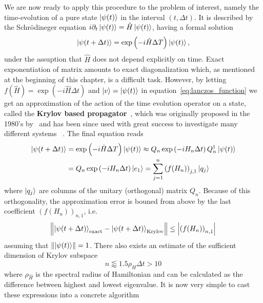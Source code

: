 We are now ready to apply this procedure to the problem of interest, namely the time-evolution of a pure
state \(\ket{\psi(t)}\) in the interval \(\left(t, \Delta t\right)\). It is described by the Schr{\"o}dineger equation
\(i\partial_t \ket{\psi(t)} = \hat{H} \ket{\psi(t)}\), having a formal solution
\begin{equation}
	\ket{\psi(t+\Delta t)} = \exp\left(-i \hat{H} \Delta T\right) \ket{\psi(t)},	
\end{equation}
under the assuption that \(\hat{H}\) does not depend explicitly on time. Exact exponentiation of matrix amounts to exact
diagonalization which, as mentioned at the beginning of this chapter, is a difficult task. However, by letting \(f(\hat{H}) = 
\exp\left(-i \hat{H} \Delta t\right)\) and \(\ket{v} = \ket{\psi(t)}\) in equation~\eqref{eq:lanczos_function} we
get an approximation of the action of the time
evolution operator on a state, called the \textbf{Krylov based propagator}~\autocite{Moler2003}, which was 
originally proposed in the 1980's by~\textcite{Park1986} and has been since used with great success to 
investigate many different systems ~\autocite{Schmitteckert2004,Stanek2013,Zaletel2015,Dargel2012}. The final equation
reads
\begin{align}
	\ket{\psi(t+\Delta t)} &= \exp\left(-i \hat{H} \Delta T\right) \ket{\psi(t)} \approx
	Q_n \exp\left(-i H_n \Delta t\right) Q_n^{\dagger}\ket{\psi(t)}\\
	 &= Q_n \exp\left(-i H_n \Delta t\right) \ket{e_1} = \sum_{j=1}^{n} \left(f(H_n)\right)_{j,1} \ket{q_j}
\end{align} 
where \(\ket{q_j}\) are columns of the unitary (orthogonal) matrix \(Q_n\). Because of this orthogonality,
the approximation error is bouned from above by the last coefficient \(\left(f(H_n)\right)_{n,1}\), i.e.
\begin{equation}
	\norm{\ket{\psi(t+\Delta t)}_{\textrm{exact}} - \ket{\psi(t+\Delta t)}_{\textrm{Krylov}}} \leq \abs{\left(f(H_n)\right)_{n,1}}
\end{equation}
assuming that \(\norm{\ket{\psi(t)}} = 1\). There also exists an estimate of the sufficient dimension of Krylov
subspace~\autocite{Mohankumar2006}
\begin{equation}
	n \lessapprox 1.5 \rho_{\hat{H}} \Delta t > 10
\end{equation}
where \(\rho_{\hat{H}}\) is the spectral radius of Hamiltonian and can be calculated as the difference between highest and lowest eigenvalue.
It is now very simple to cast these expressions into a concrete algorithm

